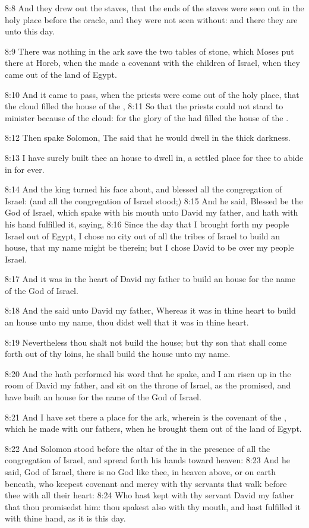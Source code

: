 8:8 And they drew out the staves, that the ends of the staves were
seen out in the holy place before the oracle, and they were not seen
without: and there they are unto this day.

8:9 There was nothing in the ark save the two tables of stone, which
Moses put there at Horeb, when the \LORD made a covenant with the
children of Israel, when they came out of the land of Egypt.

8:10 And it came to pass, when the priests were come out of the holy
place, that the cloud filled the house of the \LORD, 8:11 So that the
priests could not stand to minister because of the cloud: for the
glory of the \LORD had filled the house of the \LORD.

8:12 Then spake Solomon, The \LORD said that he would dwell in the
thick darkness.

8:13 I have surely built thee an house to dwell in, a settled place
for thee to abide in for ever.

8:14 And the king turned his face about, and blessed all the
congregation of Israel: (and all the congregation of Israel stood;)
8:15 And he said, Blessed be the \LORD God of Israel, which spake with
his mouth unto David my father, and hath with his hand fulfilled it,
saying, 8:16 Since the day that I brought forth my people Israel out
of Egypt, I chose no city out of all the tribes of Israel to build an
house, that my name might be therein; but I chose David to be over my
people Israel.

8:17 And it was in the heart of David my father to build an house for
the name of the \LORD God of Israel.

8:18 And the \LORD said unto David my father, Whereas it was in thine
heart to build an house unto my name, thou didst well that it was in
thine heart.

8:19 Nevertheless thou shalt not build the house; but thy son that
shall come forth out of thy loins, he shall build the house unto my
name.

8:20 And the \LORD hath performed his word that he spake, and I am
risen up in the room of David my father, and sit on the throne of
Israel, as the \LORD promised, and have built an house for the name of
the \LORD God of Israel.

8:21 And I have set there a place for the ark, wherein is the covenant
of the \LORD, which he made with our fathers, when he brought them out
of the land of Egypt.

8:22 And Solomon stood before the altar of the \LORD in the presence of
all the congregation of Israel, and spread forth his hands toward
heaven: 8:23 And he said, \LORD God of Israel, there is no God like
thee, in heaven above, or on earth beneath, who keepest covenant and
mercy with thy servants that walk before thee with all their heart:
8:24 Who hast kept with thy servant David my father that thou
promisedst him: thou spakest also with thy mouth, and hast fulfilled
it with thine hand, as it is this day.

